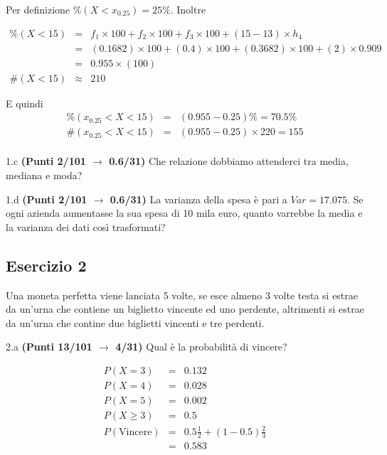 \documentclass[
  11pt,
]{book}
\theoremstyle{mytheoremstyle}
\theoremstyle{mydefstyle}
\newenvironment{sol}
  {
  \begin{tcolorbox}[enhanced,breakable,arc=0.1mm,boxrule=1pt,colback=white,colframe=iblue,
  title=\bf \fontfamily{lmss}\selectfont \hspace{.5 cm} Soluzione,drop fuzzy shadow]

}{
\end{tcolorbox}
  }
\begin{document}
\begin{sol}
Per definizione \(\%(X<x_{ 0.25 })= 25 \%\). Inoltre

\begin{eqnarray*}
   \%(X< 15 ) &=&  f_{ 1 }\times 100+f_{ 2 }\times 100+f_{ 3 }\times 100 +( 15 - 13 )\times h_{ 4 } \\
                &=&  ( 0.1682 )\times 100+( 0.4 )\times 100+( 0.3682 )\times 100 +( 2 )\times  0.909  \\
                &=&  0.955 \times(100) \\
\#(X< 15 )    &\approx& 210 
\end{eqnarray*}

E quindi
\begin{eqnarray*}
   \%( x_{0.25} < X < 15 ) &=& ( 0.955 - 0.25 )\%= 70.5 \% \\
   \#( x_{0.25} < X < 15 ) &=& ( 0.955 - 0.25 )\times  220 = 155  \\
\end{eqnarray*}

\end{sol}

1.c \textbf{(Punti 2/101 \(\rightarrow\) 0.6/31)} Che relazione dobbiamo attenderci tra media, mediana e moda?

1.d \textbf{(Punti 2/101 \(\rightarrow\) 0.6/31)} La varianza della spesa è pari a \(Var=17.075\).
Se ogni azienda aumentasse la sua spesa di 10 mila euro, quanto varrebbe la media e la varianza dei dati così trasformati?

\subsection{Esercizio 2}\label{esercizio-2-15}

Una moneta perfetta viene lanciata 5 volte, se esce almeno 3 volte testa si estrae da un'urna che contiene
un biglietto vincente ed uno perdente, altrimenti si estrae da un'urna che contine due biglietti vincenti e tre perdenti.

2.a \textbf{(Punti 13/101 \(\rightarrow\) 4/31)} Qual è la probabilità di vincere?

\begin{sol}
\begin{eqnarray*}
  P(X=3) &=& 0.132\\
  P(X=4) &=& 0.028\\
  P(X=5) &=& 0.002\\
  P(X\ge 3)  &=& 0.5\\
  P(\text{Vincere})&=& 0.5\frac12+(1-0.5)\frac23\\
  &=& 0.583
\end{eqnarray*}

\end{sol}
\end{document}
